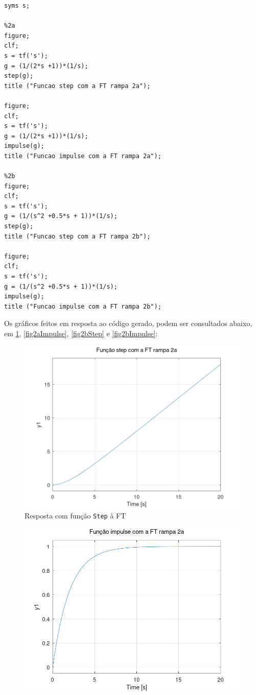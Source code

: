 \documentclass[a4paper,12pt]{article}
\begin{document}
\begin{enumerate}
\begin{enumerate}
\begin{lstlisting}
syms s;

%2a
figure;
clf;
s = tf('s');
g = (1/(2*s +1))*(1/s);
step(g);
title ("Funcao step com a FT rampa 2a");

figure;
clf;
s = tf('s');
g = (1/(2*s +1))*(1/s);
impulse(g);
title ("Funcao impulse com a FT rampa 2a");

%2b
figure;
clf;
s = tf('s');
g = (1/(s^2 +0.5*s + 1))*(1/s);
step(g);
title ("Funcao step com a FT rampa 2b");

figure;
clf;
s = tf('s');
g = (1/(s^2 +0.5*s + 1))*(1/s);
impulse(g);
title ("Funcao impulse com a FT rampa 2b");
            \end{lstlisting}
            Os gráficos feitos em resposta ao código gerado, podem ser consultados abaixo, em \ref{fig2aStep}, \ref{fig2aImpulse}, \ref{fig2bStep} e
            \ref{fig2bImpulse}:
            \begin{figure}[h]
                \centering
                \includegraphics[scale=0.4]{../fig/fig2aStep.png}
                \caption{Resposta com função \texttt{Step} à FT}
                \label{fig2aStep}
            \end{figure}
            \begin{figure}[h]
                \centering
                \includegraphics[scale=0.4]{../fig/fig2aImpulse.png}

\end{figure}
\end{enumerate}
\end{enumerate}
\end{document}

